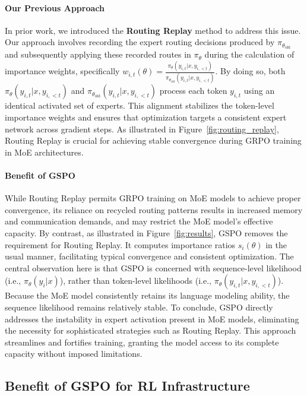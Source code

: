 \paragraph{Our Previous Approach} In prior work, we introduced the \textbf{Routing Replay} method to address this issue. Our approach involves recording the expert routing decisions produced by $\pi_{\theta_\text{old}}$ and subsequently applying these recorded routes in $\pi_{\theta}$ during the calculation of importance weights, specifically $w_{i,t}(\theta) = \frac{ \pi_{\theta} (y_{i,t} | x, y_{i,<t}) }{ \pi_{\theta_\text{old}} (y_{i,t} | x,y_{i,<t})}$. By doing so, both $\pi_{\theta} (y_{i,t} | x, y_{i,<t})$ and $\pi_{\theta_\text{old}} (y_{i,t} | x,y_{i,<t})$ process each token $y_{i,t}$ using an identical activated set of experts. This alignment stabilizes the token-level importance weights and ensures that optimization targets a consistent expert network across gradient steps.
As illustrated in Figure~\ref{fig:routing_replay}, Routing Replay is crucial for achieving stable convergence during GRPO training in MoE architectures.

\paragraph{Benefit of GSPO} While Routing Replay permits GRPO training on MoE models to achieve proper convergence, its reliance on recycled routing patterns results in increased memory and communication demands, and may restrict the MoE model’s effective capacity. By contrast, as illustrated in Figure~\ref{fig:results}, GSPO removes the requirement for Routing Replay. It computes importance ratios $s_i(\theta)$ in the usual manner, facilitating typical convergence and consistent optimization. The central observation here is that GSPO is concerned with sequence-level likelihood (i.e., $\pi_{\theta} (y_i | x)$), rather than token-level likelihoods (i.e., $\pi_{\theta} (y_{i,t} | x, y_{i,<t})$). Because the MoE model consistently retains its language modeling ability, the sequence likelihood remains relatively stable. To conclude, GSPO directly addresses the instability in expert activation present in MoE models, eliminating the necessity for sophisticated strategies such as Routing Replay. This approach streamlines and fortifies training, granting the model access to its complete capacity without imposed limitations.

\subsection{Benefit of GSPO for RL Infrastructure}

